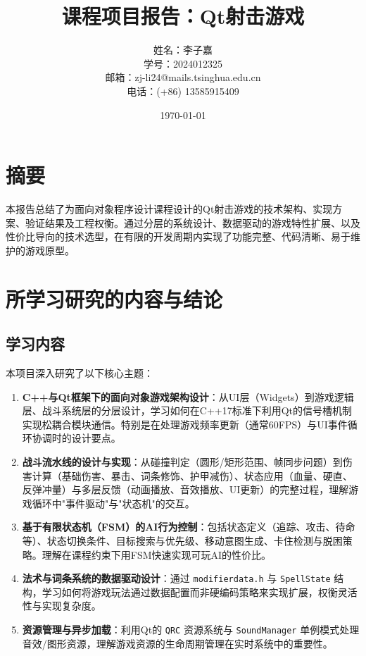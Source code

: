 ﻿\documentclass[utf8]{ctexart}
\title{课程项目报告：Qt射击游戏}
\author{
姓名：李子嘉 \\
学号：2024012325 \\
邮箱：zj-li24@mails.tsinghua.edu.cn \\
电话：(+86) 13585915409
}
\date{\today}
\begin{document}
\maketitle
\tableofcontents
\newpage

\section*{摘要}
本报告总结了为面向对象程序设计课程设计的Qt射击游戏的技术架构、实现方案、验证结果及工程权衡。通过分层的系统设计、数据驱动的游戏特性扩展、以及性价比导向的技术选型，在有限的开发周期内实现了功能完整、代码清晰、易于维护的游戏原型。

\section{所学习研究的内容与结论}

\subsection{学习内容}

本项目深入研究了以下核心主题：

\begin{enumerate}
  \item \textbf{C++与Qt框架下的面向对象游戏架构设计}：从UI层（Widgets）到游戏逻辑层、战斗系统层的分层设计，学习如何在C++17标准下利用Qt的信号槽机制实现松耦合模块通信。特别是在处理游戏频率更新（通常60FPS）与UI事件循环协调时的设计要点。

  \item \textbf{战斗流水线的设计与实现}：从碰撞判定（圆形/矩形范围、帧同步问题）到伤害计算（基础伤害、暴击、词条修饰、护甲减伤）、状态应用（血量、硬直、反弹冲量）与多层反馈（动画播放、音效播放、UI更新）的完整过程，理解游戏循环中"事件驱动"与"状态机"的交互。

  \item \textbf{基于有限状态机（FSM）的AI行为控制}：包括状态定义（追踪、攻击、待命等）、状态切换条件、目标搜索与优先级、移动意图生成、卡住检测与脱困策略。理解在课程约束下用FSM快速实现可玩AI的性价比。

  \item \textbf{法术与词条系统的数据驱动设计}：通过 \texttt{modifierdata.h} 与 \texttt{SpellState} 结构，学习如何将游戏玩法通过数据配置而非硬编码策略来实现扩展，权衡灵活性与实现复杂度。

  \item \textbf{资源管理与异步加载}：利用Qt的 \texttt{QRC} 资源系统与 \texttt{SoundManager} 单例模式处理音效/图形资源，理解游戏资源的生命周期管理在实时系统中的重要性。
\end{enumerate}
\end{document}
